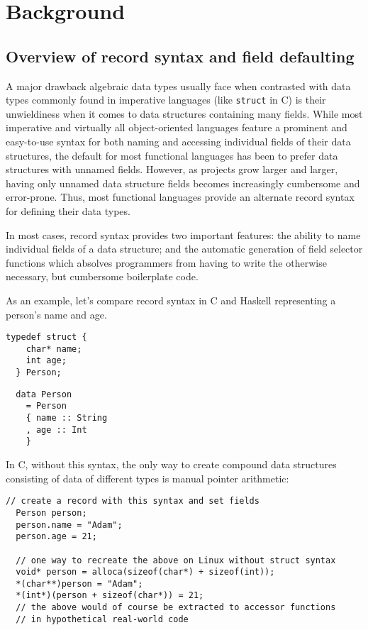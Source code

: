 \documentclass[en]{pracamgr}
\newcommand{\code}[1]{\lstinline[breaklines=true]{#1}}
\begin{document}
\chapter{Background}\label{ch:bg}
\section{Overview of record syntax and field defaulting}
A major drawback algebraic data types usually face when contrasted with data types commonly found in imperative languages (like \code{struct} in C) is their unwieldiness when it comes to data structures containing many fields.
While most imperative and virtually all object-oriented languages feature a prominent and easy-to-use syntax for both naming and accessing individual fields of their data structures, the default for most functional languages has been to prefer data structures with unnamed fields.
However, as projects grow larger and larger, having only unnamed data structure fields becomes increasingly cumbersome and error-prone.
Thus, most functional languages provide an alternate record syntax for defining their data types. 

In most cases, record syntax provides two important features: 
the ability to name individual fields of a data structure; 
and the automatic generation of field selector functions which
absolves programmers from having to write the otherwise necessary,
but cumbersome boilerplate code.

As an example, let's compare record syntax in C and Haskell representing a person's name and age.

\begin{lstlisting}[style=c]
  typedef struct {
    char* name;
    int age;
  } Person;
\end{lstlisting}

\begin{lstlisting}
  data Person 
    = Person 
    { name :: String
    , age :: Int
    }
\end{lstlisting}
In C, without this syntax, the only way to create compound data structures consisting of data of different types is manual pointer arithmetic:\\
\begin{minipage}{\linewidth}
\begin{lstlisting}[style=c]
  // create a record with this syntax and set fields
  Person person;
  person.name = "Adam";
  person.age = 21;

  // one way to recreate the above on Linux without struct syntax
  void* person = alloca(sizeof(char*) + sizeof(int));
  *(char**)person = "Adam";
  *(int*)(person + sizeof(char*)) = 21;
  // the above would of course be extracted to accessor functions
  // in hypothetical real-world code
\end{lstlisting}
\end{minipage}
\end{document}
